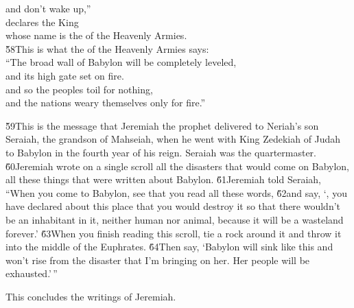 \begin{poetry}
\poemll    and don't wake up,'' \\
\poeml declares the King \\
\poemll    whose name is the  of the Heavenly Armies. \\
\poeml \v{58}This is what the  of the Heavenly Armies says: \\
\poeml ``The broad wall of Babylon will be completely leveled, \\
\poemll    and its high gate set on fire. \\
\poeml and so the peoples toil for nothing, \\
\poemll    and the nations weary themselves only for fire.''
\end{poetry}

\v{59}This is the message that Jeremiah the prophet delivered to Neriah's son Seraiah, the grandson of Mahseiah, when he went with King Zedekiah of Judah to Babylon in the fourth year of his reign. Seraiah was the quartermaster. \v{60}Jeremiah wrote on a single scroll all the disasters that would come on Babylon, all these things that were written about Babylon. \v{61}Jeremiah told Seraiah, ``When you come to Babylon, see that you read all these words, \v{62}and say, `, you have declared about this place that you would destroy it so that there wouldn't be an inhabitant in it, neither human nor animal, because it will be a wasteland forever.' \v{63}When you finish reading this scroll, tie a rock around it and throw it into the middle of the Euphrates. \v{64}Then say, `Babylon will sink like this and won't rise from the disaster that I'm bringing on her. Her people will be exhausted.'\,''

\begin{poetry}
\poeml This concludes the writings of Jeremiah.
\end{poetry}

